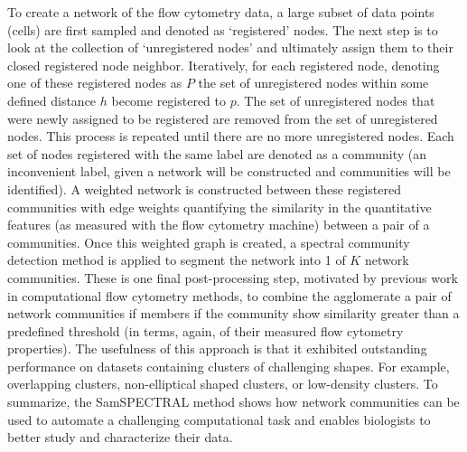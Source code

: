 \indent To create a network of the flow cytometry data, a large subset of data points (cells) are first sampled and denoted as `registered' nodes. The next step is to look at the collection of `unregistered nodes' and ultimately assign them to their closed registered node neighbor. Iteratively, for each registered node, denoting one of these registered nodes as $P$ the set of unregistered nodes within some defined distance $h$ become registered to $p$.  The set of unregistered nodes that were newly assigned to be registered are removed from the set of unregistered nodes. This process is repeated until there are no more unregistered nodes. Each set of nodes registered with the same label are denoted as a community (an inconvenient label, given a network will be constructed and communities will be identified). A weighted network is constructed between these registered communities with edge weights quantifying the similarity in the quantitative features (as measured with the flow cytometry machine) between a pair of a communities. Once this weighted graph is created, a spectral community detection method \cite{spectral1} is applied to segment the network into 1 of $K$ network communities. These is one final post-processing step, motivated by previous work in computational flow cytometry methods,  to combine the agglomerate a pair of network communities if members if the community show similarity greater than a predefined threshold (in terms, again, of their measured flow cytometry properties). The usefulness of this approach is that it exhibited outstanding performance on datasets containing clusters of challenging shapes. For example, overlapping clusters, non-elliptical shaped clusters, or low-density clusters. To summarize, the SamSPECTRAL method shows how network communities can be used to automate a challenging computational task and enables biologists to better study and characterize their data.  

